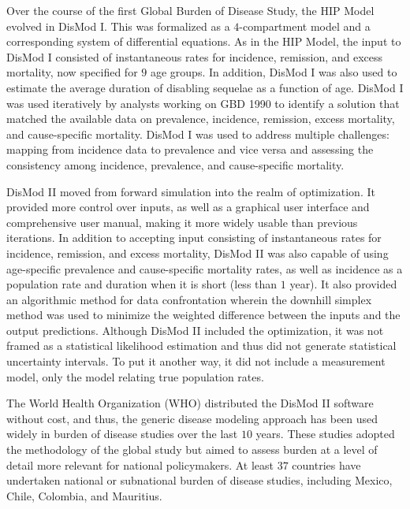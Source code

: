 Over the course of the first Global Burden of Disease Study, the HIP
Model evolved in DisMod
I.\cite{murray_global_1996}
This was formalized as a $4$-compartment model and a corresponding
system of differential equations.  As in the HIP Model, the input to
DisMod I consisted of instantaneous rates for incidence, remission,
and excess mortality, now specified for $9$ age groups.  In addition,
DisMod I was also used to
estimate the average duration of disabling sequelae as a function of
age.  DisMod I was used iteratively by analysts working on GBD 1990
to identify a solution that matched the available data on
prevalence, incidence, remission, excess mortality, and cause-specific
mortality.  DisMod I was used to address multiple challenges: mapping
from incidence data to prevalence and vice versa and assessing the
consistency among incidence, prevalence, and cause-specific mortality.

DisMod II moved from forward simulation into the realm of
optimization.  It provided more control over inputs, as well as a
graphical user interface and comprehensive user manual, making it more
widely usable than previous iterations.\cite{barendregt_generic_2003}
In addition to accepting input consisting of instantaneous rates for incidence,
remission, and excess mortality, DisMod II was also capable of using
age-specific prevalence and cause-specific mortality rates, as well as
incidence as a population rate and duration when it is short (less
than $1$ year).  It also provided an algorithmic method for data
confrontation wherein the downhill simplex method was used to
minimize the weighted difference between the inputs and the output
predictions.  Although DisMod II included the
optimization, it was not framed as a statistical likelihood estimation
and thus did not generate statistical uncertainty intervals.  To put it another
way, it did not include a measurement model, only the model relating
true population rates.

The World Health Organization (WHO) distributed the DisMod II software
without cost, and thus, the generic disease modeling approach
has been used widely in burden of disease studies over the last $10$
years. These studies adopted the methodology of the global study but
aimed to assess burden at a level of detail more relevant for national
policymakers. At least $37$ countries have undertaken national or
subnational burden of disease studies, including Mexico,
Chile, Colombia, and
Mauritius.\cite{Lozano_Burden_1995,republica_de_colombia_ministerio_de_salud_carga_1994,concha_barrientos_carga_1996,Vos_Mauritius_1996}

